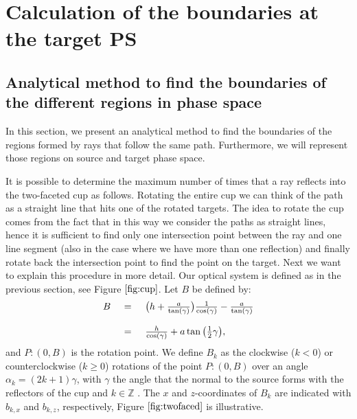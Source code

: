 \chapter{Calculation of the boundaries at the target PS}\label{app:boundariescup}
\section{Analytical method to find the boundaries of the different regions in phase space}
In this section, we present an analytical method to find the boundaries of the regions formed by rays that follow the same path. Furthermore, we will represent those regions on source and target phase space.

It is possible to determine the maximum number of times that a ray reflects into the two-faceted cup as follows. Rotating the entire cup we can think of the path as a straight line that hits one of the rotated targets. The idea to rotate the cup comes from the fact that in this way we consider the paths as straight lines, hence it is sufficient to find only one intersection point between the ray and one line segment (also in the case where we have more than one reflection) and finally rotate back the intersection point to find the point on the target.
Next we want to explain this procedure in more detail.
Our optical system is defined as in the previous section, see Figure $\ref{fig:cup}$.
Let $B$ be defined by:
\begin{equation}\label{rotation}\begin{tabular}{llll}
$ B$ & $=$ & $ \big(h+\frac{a}{\tan(\gamma)}\big)\frac{1}{\cos(\gamma)}-\frac{a}{\tan(\gamma)}$ \\ $ \quad$ & $ \quad $ & $ \quad $ \\$ \quad$ &  $=$ & $\frac{h}{\cos(\gamma)}+a\tan\big(\frac{1}{2}\gamma\big),$\end{tabular}
\end{equation} and $P:(0,B)$ is the rotation point. We define $B_k$ as the clockwise ($k<0$) or counterclockwise ($k\geq 0$) rotations of the point $P:(0,B)$ over an angle $\alpha_k=(2k+1)\gamma$, with $\gamma$ the angle that the normal to the source forms with the reflectors of the cup and $ k\in \mathbb{Z} $ . The $x$ and $z$-coordinates of $B_k$ are indicated with $b_{k,x}$ and $b_{k,z}$, respectively, Figure $\ref{fig:twofaced}$ is illustrative.
